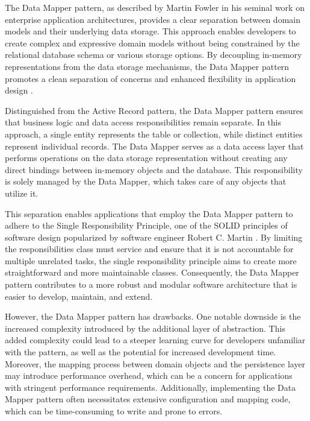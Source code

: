 The Data Mapper pattern, as described by Martin Fowler in his seminal work on
enterprise application architectures, provides a clear separation between domain
models and their underlying data storage. This approach enables developers to
create complex and expressive domain models without being constrained by the
relational database schema or various storage options. By decoupling in-memory
representations from the data storage mechanisms, the Data Mapper pattern
promotes a clean separation of concerns and enhanced flexibility in application
design \cite[p. 165]{fowler-patterns-2003}.

Distinguished from the Active Record pattern, the Data Mapper pattern ensures
that business logic and data access responsibilities remain separate. In this
approach, a single entity represents the table or collection, while distinct
entities represent individual records. The Data Mapper serves as a data access
layer that performs operations on the data storage representation without
creating any direct bindings between in-memory objects and the database. This
responsibility is solely managed by the Data Mapper, which takes care of any
objects that utilize it.

This separation enables applications that employ the Data Mapper pattern to
adhere to the Single Responsibility Principle, one of the SOLID principles of
software design popularized by software engineer Robert C. Martin
\cite{PrinciplesOfOod}. By limiting the responsibilities class must service and
ensure that it is not accountable for multiple unrelated tasks, the single
responsibility principle aims to create more straightforward and more
maintainable classes. Consequently, the Data Mapper pattern contributes to a
more robust and modular software architecture that is easier to develop,
maintain, and extend.

However, the Data Mapper pattern has drawbacks. One notable downside is the
increased complexity introduced by the additional layer of abstraction. This
added complexity could lead to a steeper learning curve for developers
unfamiliar with the pattern, as well as the potential for increased development
time. Moreover, the mapping process between domain objects and the persistence
layer may introduce performance overhead, which can be a concern for
applications with stringent performance requirements. Additionally, implementing
the Data Mapper pattern often necessitates extensive configuration and mapping
code, which can be time-consuming to write and prone to errors.



